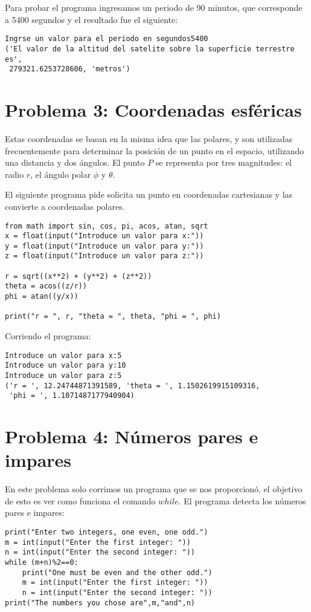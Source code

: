 \documentclass[12pt,letterpaper]{article}
\begin{document}
Para probar el programa ingresamos un periodo de 90 minutos, que corresponde a 5400 segundos y el resultado fue el siguiente: 

\begin{verbatim}
Ingrse un valor para el periodo en segundos5400
('El valor de la altitud del satelite sobre la superficie terrestre es',
 279321.6253728606, 'metros')
\end{verbatim}

\section{Problema 3: Coordenadas esféricas}
Estas coordenadas se basan en la misma idea que las polares, y son utilizadas frecuentemente para determinar la posición de un punto en el espacio, utilizando una distancia y dos ángulos. 
El punto $P$ se representa por tres magnitudes: el radio $r$, el ángulo polar $\phi$ y $\theta$.

El siguiente programa pide solicita un punto en coordenadas cartesianas y las convierte a coordenadas polares.

\begin{verbatim}
from math import sin, cos, pi, acos, atan, sqrt
x = float(input("Introduce un valor para x:"))
y = float(input("Introduce un valor para y:"))
z = float(input("Introduce un valor para z:"))

r = sqrt((x**2) + (y**2) + (z**2))
theta = acos((z/r))
phi = atan((y/x))

print("r = ", r, "theta = ", theta, "phi = ", phi)
\end{verbatim}

Corriendo el programa: 

\begin{verbatim}
Introduce un valor para x:5
Introduce un valor para y:10
Introduce un valor para z:5
('r = ', 12.24744871391589, 'theta = ', 1.1502619915109316,
 'phi = ', 1.1071487177940904)
\end{verbatim}

\section{Problema 4: Números pares e impares}
En este problema solo corrimos un programa que se nos proporcionó, el objetivo de esto es ver como funciona el comando $while$. El programa detecta los números pares e impares: 

\begin{verbatim}
print("Enter two integers, one even, one odd.")
m = int(input("Enter the first integer: "))
n = int(input("Enter the second integer: "))
while (m+n)%2==0:
    print("One must be even and the other odd.")
    m = int(input("Enter the first integer: "))
    n = int(input("Enter the second integer: "))
print("The numbers you chose are",m,"and",n)
\end{verbatim}
\end{document}
